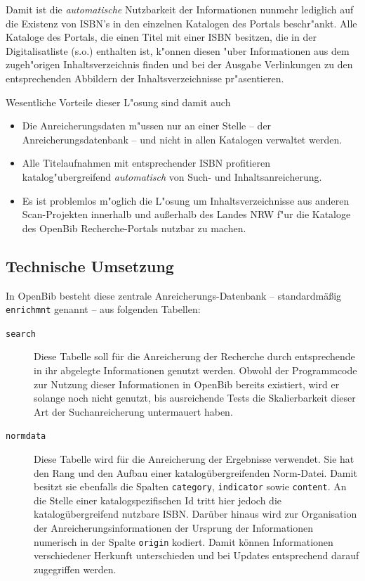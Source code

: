 \documentclass[11pt, twoside, a4paper, BCOR8mm, DIV12, bibtotoc,idxtotoc]{scrbook}
\begin{document}
Damit ist die \emph{automatische} Nutzbarkeit der Informationen nunmehr
lediglich auf die Existenz von ISBN's in den einzelnen Katalogen des
Portals beschr"ankt. Alle Kataloge des Portals, die einen Titel mit einer
ISBN besitzen, die in der Digitalisatliste (s.o.) enthalten ist,
k"onnen diesen "uber Informationen aus dem zugeh"origen
Inhaltsverzeichnis finden und bei der Ausgabe Verlinkungen zu den
entsprechenden Abbildern der Inhaltsverzeichnisse pr"asentieren.

Wesentliche Vorteile dieser L"osung sind damit auch

\begin{itemize}
\item Die Anreicherungsdaten m"ussen nur an einer Stelle -- der
  Anreicherungsdatenbank -- und nicht in allen Katalogen verwaltet werden.
\item Alle Titelaufnahmen mit entsprechender ISBN profitieren
  katalog"ubergreifend \emph{automatisch} von Such- und
  Inhaltsanreicherung.
\item Es ist problemlos m"oglich die L"osung um Inhaltsverzeichnisse
  aus anderen Scan-Projekten innerhalb und außerhalb des Landes NRW
  f"ur die Kataloge des OpenBib Recherche-Portals nutzbar zu machen.
\end{itemize}


\subsection{Technische Umsetzung}

In OpenBib besteht diese zentrale Anreicherungs-Datenbank --
standardmäßig \texttt{enrichmnt} genannt -- aus folgenden Tabellen:

\begin{description}
\item[\texttt{search}] Diese Tabelle soll für die Anreicherung der Recherche
  durch entsprechende in ihr abgelegte Informationen genutzt
  werden. Obwohl der Programmcode zur Nutzung dieser Informationen
  in OpenBib bereits existiert, wird er solange noch nicht genutzt,
  bis ausreichende Tests die Skalierbarkeit dieser Art der
  Suchanreicherung untermauert haben.

\item[\texttt{normdata}] Diese Tabelle wird für die Anreicherung der
  Ergebnisse verwendet. Sie hat den Rang und den Aufbau einer
  katalog\-übergreifenden Norm-Datei. Damit besitzt sie ebenfalls die
  Spalten \texttt{category}, \texttt{indicator} sowie
  \texttt{content}. An die Stelle einer katalog\-spezifischen Id tritt
  hier jedoch die katalogübergreifend nutzbare ISBN. Darüber hinaus
  wird zur Organisation der Anreicherungsinformationen der Ursprung
  der Informationen numerisch in der Spalte \texttt{origin}
  kodiert. Damit können Informationen verschiedener Herkunft
  unterschieden und bei Updates entsprechend darauf zugegriffen werden.   
\end{description}
\end{document}
